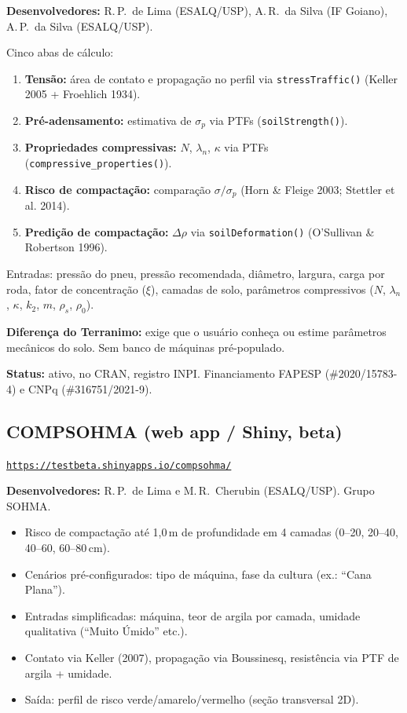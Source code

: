 \documentclass[12pt,a4paper]{article}
\newcommand{\SubsectionKeep}[1]{\needspace{10\baselineskip}\subsection{#1}}
\newcommand{\Link}[1]{\href{#1}{\nolinkurl{#1}}}
\newenvironment{NoBreakEnumerate}
{\begin{samepage}\begin{enumerate}}
{\end{enumerate}\end{samepage}}
\newenvironment{NoBreakItemize}
{\begin{samepage}\begin{itemize}}
{\end{itemize}\end{samepage}}
\begin{document}
\textbf{Desenvolvedores:} R.\,P.\ de Lima (ESALQ/USP), A.\,R.\ da Silva (IF Goiano), A.\,P.\ da Silva (ESALQ/USP).

Cinco abas de cálculo:
\begin{NoBreakEnumerate}
  \item \textbf{Tensão:} área de contato e propagação no perfil via \texttt{stressTraffic()} (Keller 2005 + Froehlich 1934).
  \item \textbf{Pré-adensamento:} estimativa de $\sigma_p$ via PTFs (\texttt{soilStrength()}).
  \item \textbf{Propriedades compressivas:} $N$, $\lambda_n$, $\kappa$ via PTFs (\texttt{compressive\_properties()}).
  \item \textbf{Risco de compactação:} comparação $\sigma/\sigma_p$ (Horn \& Fleige 2003; Stettler et al. 2014).
  \item \textbf{Predição de compactação:} $\Delta\rho$ via \texttt{soilDeformation()} (O'Sullivan \& Robertson 1996).
\end{NoBreakEnumerate}

Entradas: pressão do pneu, pressão recomendada, diâmetro, largura, carga por roda, fator de concentração ($\xi$), camadas de solo, parâmetros compressivos ($N$, $\lambda_n$, $\kappa$, $k_2$, $m$, $\rho_s$, $\rho_0$).

\textbf{Diferença do Terranimo:} exige que o usuário conheça ou estime parâmetros mecânicos do solo. Sem banco de máquinas pré-populado.

\textbf{Status:} ativo, no CRAN, registro INPI. Financiamento FAPESP (\#2020/15783-4) e CNPq (\#316751/2021-9).

\SubsectionKeep{COMPSOHMA (web app / Shiny, beta)}
\Link{https://testbeta.shinyapps.io/compsohma/}

\textbf{Desenvolvedores:} R.\,P.\ de Lima e M.\,R.\ Cherubin (ESALQ/USP). Grupo SOHMA.

\begin{NoBreakItemize}
  \item Risco de compactação até 1,0\,m de profundidade em 4 camadas (0--20, 20--40, 40--60, 60--80\,cm).
  \item Cenários pré-configurados: tipo de máquina, fase da cultura (ex.: ``Cana Plana'').
  \item Entradas simplificadas: máquina, teor de argila por camada, umidade qualitativa (``Muito Úmido'' etc.).
  \item Contato via Keller (2007), propagação via Boussinesq, resistência via PTF de argila + umidade.
  \item Saída: perfil de risco verde/amarelo/vermelho (seção transversal 2D).
\end{NoBreakItemize}
\end{document}
